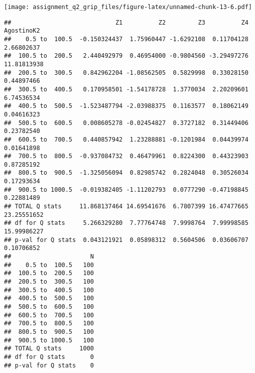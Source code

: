 \begin{Shaded}
\begin{Highlighting}[]
\OtherTok{\textless{}{-}} 
\end{Highlighting}
\end{Shaded}

\texttt{[image: assignment\_q2\_grip\_files/figure-latex/unnamed-chunk-13-6.pdf]}

\begin{Shaded}
\begin{Highlighting}[]
\end{Highlighting}
\end{Shaded}

\begin{verbatim}
##                             Z1          Z2         Z3          Z4  AgostinoK2
##    0.5 to  100.5  -0.150324437  1.75960447 -1.6292108  0.11704128  2.66802637
##  100.5 to  200.5   2.440492979  0.46954000 -0.9804560 -3.29497276 11.81813938
##  200.5 to  300.5   0.842962204 -1.08562505  0.5829998  0.33028150  0.44897466
##  300.5 to  400.5   0.170958501 -1.54178728  1.3770034  2.20209601  6.74536534
##  400.5 to  500.5  -1.523487794 -2.03988375  0.1163577  0.18062149  0.04616323
##  500.5 to  600.5   0.008605278 -0.02454827  0.3727182  0.31449406  0.23782540
##  600.5 to  700.5   0.440857942  1.23288881 -0.1201984  0.04439974  0.01641898
##  700.5 to  800.5  -0.937084732  0.46479961  0.8224300  0.44323903  0.87285192
##  800.5 to  900.5  -1.325056094  0.82985742  0.2824048  0.30526034  0.17293634
##  900.5 to 1000.5  -0.019382405 -1.11202793  0.0777290 -0.47198845  0.22881489
## TOTAL Q stats     11.868137464 14.69541676  6.7807399 16.47477665 23.25551652
## df for Q stats     5.266329280  7.77764748  7.9998764  7.99998585 15.99986227
## p-val for Q stats  0.043121921  0.05898312  0.5604506  0.03606707  0.10706852
##                      N
##    0.5 to  100.5   100
##  100.5 to  200.5   100
##  200.5 to  300.5   100
##  300.5 to  400.5   100
##  400.5 to  500.5   100
##  500.5 to  600.5   100
##  600.5 to  700.5   100
##  700.5 to  800.5   100
##  800.5 to  900.5   100
##  900.5 to 1000.5   100
## TOTAL Q stats     1000
## df for Q stats       0
## p-val for Q stats    0
\end{verbatim}
